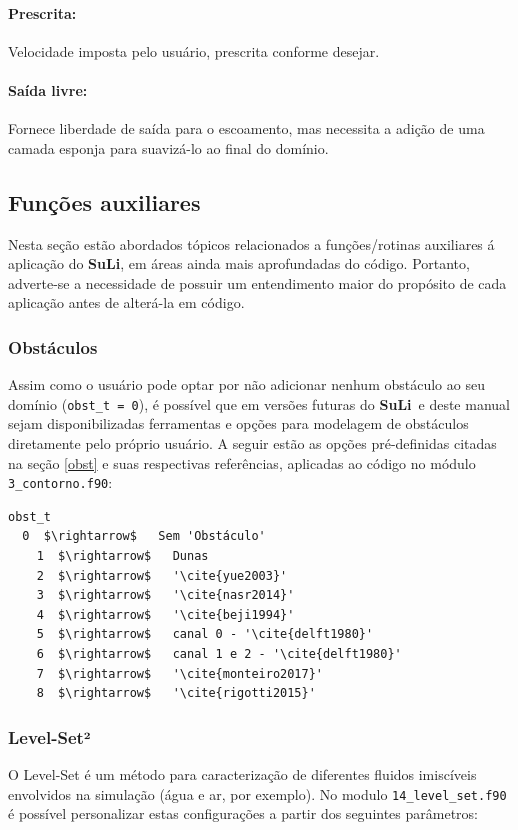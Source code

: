 \documentclass[12pt, a4paper]{article}
\newcommand{\SL}{{\bf SuLi}}
\begin{document}
\paragraph{Prescrita:} Velocidade imposta pelo usuário, prescrita conforme desejar.
\paragraph{Saída livre:} Fornece liberdade de saída para o escoamento, mas necessita a adição de uma camada esponja para suavizá-lo ao final do domínio.




\subsection{Funções auxiliares}
Nesta seção estão abordados tópicos relacionados a funções/rotinas auxiliares á aplicação do \SL, em áreas ainda mais aprofundadas do código. Portanto, adverte-se a necessidade de possuir um entendimento maior do propósito de cada aplicação antes de alterá-la em código.

\subsubsection{Obstáculos} \label{met_num}
Assim como o usuário pode optar por não adicionar nenhum obstáculo ao seu domínio (\verb|obst_t = 0|), é possível que em versões futuras do \SL\ e deste manual sejam disponibilizadas ferramentas e opções para modelagem de obstáculos diretamente pelo próprio usuário. A seguir estão as opções pré-definidas citadas na seção \ref{obst} e suas respectivas referências, aplicadas ao código no módulo \verb|3_contorno.f90|:

\begin{lstlisting}[escapeinside='']
obst_t	
  0  $\rightarrow$   Sem 'Obstáculo'
	1  $\rightarrow$   Dunas
	2  $\rightarrow$   '\cite{yue2003}'
	3  $\rightarrow$   '\cite{nasr2014}'
	4  $\rightarrow$   '\cite{beji1994}'
	5  $\rightarrow$   canal 0 - '\cite{delft1980}'
	6  $\rightarrow$   canal 1 e 2 - '\cite{delft1980}'
	7  $\rightarrow$   '\cite{monteiro2017}'
	8  $\rightarrow$   '\cite{rigotti2015}'
\end{lstlisting}

\subsubsection{Level-Set²} \label{sub:levelset}
O Level-Set é um método para caracterização de diferentes fluidos imiscíveis envolvidos na simulação (água e ar, por exemplo). No modulo \verb|14_level_set.f90| é possível personalizar estas configurações a partir dos seguintes parâmetros:
\end{document}
